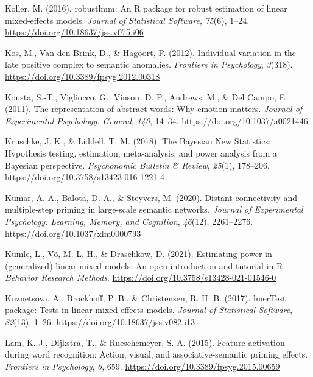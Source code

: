 \documentclass[
  12pt,
  man,floatsintext]{apa7}
\newlength{\cslhangindent}
\newlength{\cslentryspacingunit} %
\newenvironment{CSLReferences}[2] %
 {%
  \setlength{\parindent}{0pt}
  \ifodd #1
  \let\oldpar\par
  \def\par{\hangindent=\cslhangindent\oldpar}
  \fi
  \setlength{\parskip}{#2\cslentryspacingunit}
 }%
 {}
\begin{document}
\begin{CSLReferences}{1}{0}
\leavevmode{}%
Koller, M. (2016). {robustlmm}: An {R} package for robust estimation of linear mixed-effects models. \emph{Journal of Statistical Software}, \emph{75}(6), 1--24. \url{https://doi.org/10.18637/jss.v075.i06}

\leavevmode{}%
Kos, M., Van den Brink, D., \& Hagoort, P. (2012). Individual variation in the late positive complex to semantic anomalies. \emph{Frontiers in Psychology}, \emph{3}(318). \url{https://doi.org/10.3389/fpsyg.2012.00318}

\leavevmode{}%
Kousta, S.-T., Vigliocco, G., Vinson, D. P., Andrews, M., \& Del Campo, E. (2011). The representation of abstract words: {Why} emotion matters. \emph{Journal of Experimental Psychology: General}, \emph{140}, 14--34. \url{https://doi.org/10.1037/a0021446}

\leavevmode{}%
Kruschke, J. K., \& Liddell, T. M. (2018). The {Bayesian New Statistics}: {Hypothesis} testing, estimation, meta-analysis, and power analysis from a {Bayesian} perspective. \emph{Psychonomic Bulletin \& Review}, \emph{25}(1), 178--206. \url{https://doi.org/10.3758/s13423-016-1221-4}

\leavevmode{}%
Kumar, A. A., Balota, D. A., \& Steyvers, M. (2020). Distant connectivity and multiple-step priming in large-scale semantic networks. \emph{Journal of Experimental Psychology: Learning, Memory, and Cognition}, \emph{46}(12), 2261--2276. \url{https://doi.org/10.1037/xlm0000793}

\leavevmode{}%
Kumle, L., Võ, M. L.-H., \& Draschkow, D. (2021). Estimating power in (generalized) linear mixed models: {An} open introduction and tutorial in {R}. \emph{Behavior Research Methods}. \url{https://doi.org/10.3758/s13428-021-01546-0}

\leavevmode{}%
Kuznetsova, A., Brockhoff, P. B., \& Christensen, R. H. B. (2017). {lmerTest} package: Tests in linear mixed effects models. \emph{Journal of Statistical Software}, \emph{82}(13), 1--26. \url{https://doi.org/10.18637/jss.v082.i13}

\leavevmode{}%
Lam, K. J., Dijkstra, T., \& Rueschemeyer, S. A. (2015). Feature activation during word recognition: Action, visual, and associative-semantic priming effects. \emph{Frontiers in Psychology}, \emph{6}, 659. \url{https://doi.org/10.3389/fpsyg.2015.00659}


\end{CSLReferences}
\end{document}
